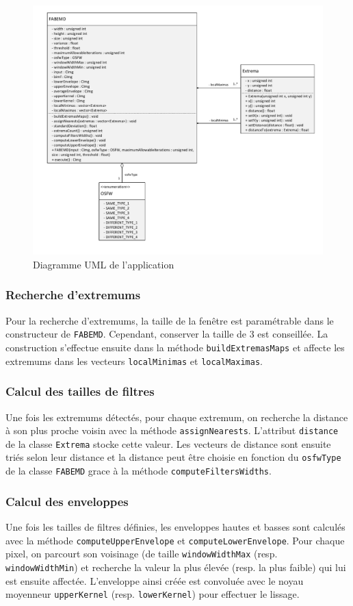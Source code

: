 \begin{figure}[h!]
	\caption{Diagramme UML de l'application}
	\label{fig:uml}
	\centering
	\includegraphics[scale=0.6]{img/uml}
\end{figure}

\subsubsection{Recherche d'extremums}
Pour la recherche d'extremums, la taille de la fenêtre est paramétrable dans le constructeur de \texttt{FABEMD}. Cependant, conserver la taille de 3 est conseillée. La construction s'effectue ensuite dans la méthode \texttt{buildExtremasMaps} et affecte les extremums dans les vecteurs \texttt{localMinimas} et \texttt{localMaximas}.

\subsubsection{Calcul des tailles de filtres}
Une fois les extremums détectés, pour chaque extremum, on recherche la distance à son plus proche voisin avec la méthode \texttt{assignNearests}. L'attribut \texttt{distance} de la classe \texttt{Extrema} stocke cette valeur. Les vecteurs de distance sont ensuite triés selon leur distance et la distance peut être choisie en fonction du \texttt{osfwType} de la classe \texttt{FABEMD} grace à la méthode \texttt{computeFiltersWidths}.

\subsubsection{Calcul des enveloppes}
Une fois les tailles de filtres définies, les enveloppes hautes et basses sont calculés avec la méthode \texttt{computeUpperEnvelope} et \texttt{computeLowerEnvelope}. Pour chaque pixel, on parcourt son voisinage (de taille \texttt{windowWidthMax} (resp. \texttt{windowWidthMin}) et recherche la valeur la plus élevée (resp. la plus faible) qui lui est ensuite affectée. L'enveloppe ainsi créée est convoluée avec le noyau moyenneur \texttt{upperKernel} (resp. \texttt{lowerKernel}) pour effectuer le lissage.

